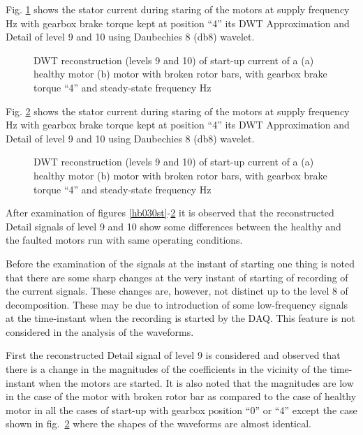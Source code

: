 \documentclass[a4paper,11pt]{report}
\begin{document}
\clearpage
Fig. \ref{hb440st} shows the stator current during staring of the motors at supply frequency \unit[40]{Hz} with gearbox brake torque kept at position ``4'' its DWT Approximation and Detail of level 9 and 10 using Daubechies 8 (db8) wavelet.

\begin{figure}[h]
\centering
\subfigure[]{\texttt{[image: h440st]}}
\subfigure[]{\texttt{[image: b440st]}}
\caption{DWT reconstruction (levels 9 and 10) of start-up current of a (a) healthy motor (b) motor with broken rotor bars, with gearbox brake torque ``4'' and steady-state frequency \unit[40]{Hz}} \label{hb440st}
\end{figure}

\clearpage
Fig. \ref{hb450st} shows the stator current during staring of the motors at supply frequency \unit[50]{Hz} with gearbox brake torque kept at position ``4'' its DWT Approximation and Detail of level 9 and 10 using Daubechies 8 (db8) wavelet.

\begin{figure}[h]
\centering
\subfigure[]{\texttt{[image: h450st]}}
\subfigure[]{\texttt{[image: b450st]}}
\caption{DWT reconstruction (levels 9 and 10) of start-up current of a (a) healthy motor (b) motor with broken rotor bars, with gearbox brake torque ``4'' and steady-state frequency \unit[50]{Hz}} \label{hb450st}
\end{figure}

\clearpage
After examination of figures \ref{hb030st}-\ref{hb450st} it is observed that the reconstructed Detail signals of level 9 and 10 show some differences between the healthy and the faulted motors run with same operating conditions. 

Before the examination of the signals at the instant of starting one thing is noted that there are some sharp changes at the very instant of starting of recording of the current signals. These changes are, however, not distinct up to the level 8 of decomposition. These may be due to introduction of some low-frequency signals at the time-instant when the recording is started by the DAQ. This feature is not considered in the analysis of the waveforms.

First the reconstructed Detail signal of level 9 is considered and observed that there is a change in the magnitudes of the coefficients in the vicinity of the time-instant when the motors are started. It is also noted that the magnitudes are low in the case of the motor with broken rotor bar as compared to the case of healthy motor in all the cases of start-up with gearbox position ``0'' or ``4'' except the case shown in fig.~\ref{hb450st} where the shapes of the waveforms are almost identical. 
\end{document}
